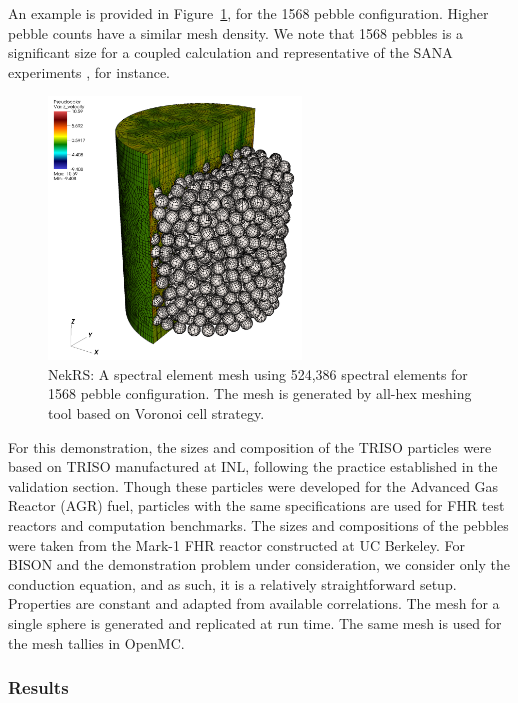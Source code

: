 An example is provided in Figure~\ref{f:ndemo1}, for the 1568
pebble configuration. Higher pebble counts have a similar mesh density.
We note that 1568 pebbles is a significant size for a coupled calculation and
representative of the SANA experiments \cite{zou2017validation}, for instance.

\begin{figure}[H]
\centering
\includegraphics[clip=true,width=0.6\textwidth]{Figures/ndemo_r1}
\caption{NekRS: A spectral element mesh using 524,386 spectral elements for 1568 pebble configuration.
         The mesh is generated by all-hex meshing tool based on Voronoi cell strategy.}
\label{f:ndemo1}
\end{figure}

For this demonstration, the sizes and composition of the TRISO particles were based on TRISO manufactured at INL, following the practice established in the validation section. Though these particles were developed for the Advanced Gas Reactor (AGR) fuel, particles with the same specifications are used for FHR test reactors and computation benchmarks. The sizes and compositions of the pebbles were taken from the Mark-1 FHR reactor constructed at UC Berkeley. For BISON and the demonstration problem under consideration, we consider only the conduction equation, and as such, it is a relatively straightforward setup. Properties are constant and adapted from available correlations. The mesh for a single sphere is generated and replicated at run time. The same mesh is used for the mesh tallies in OpenMC.

\subsubsection{Results}

